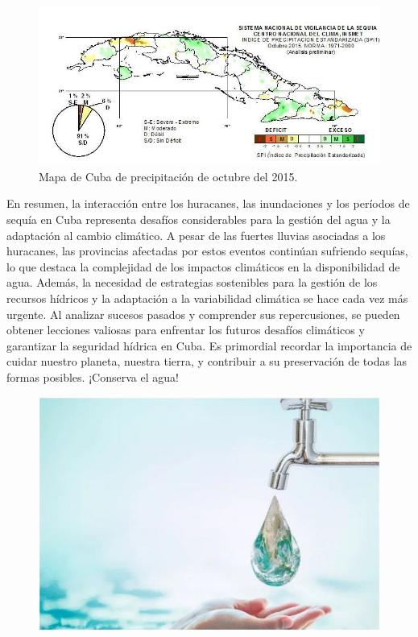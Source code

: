 \documentclass[12pt]{article}
\begin{document}
	\begin{figure}[H]
		\centering
		\includegraphics[width=0.7\linewidth]{./Report/images/mapa_octubre_2015}
		\caption{Mapa de Cuba de precipitación de octubre del 2015.}
		\label{fig:mapaoctubre2015}
	\end{figure}
	
	En resumen, la interacción entre los huracanes, las inundaciones y los períodos de sequía en Cuba representa desafíos considerables para la gestión del agua y la adaptación al cambio climático. A pesar de las fuertes lluvias asociadas a los huracanes, las provincias afectadas por estos eventos continúan sufriendo sequías, lo que destaca la complejidad de los impactos climáticos en la disponibilidad de agua. Además, la necesidad de estrategias sostenibles para la gestión de los recursos hídricos y la adaptación a la variabilidad climática se hace cada vez más urgente. Al analizar sucesos pasados y comprender sus repercusiones, se pueden obtener lecciones valiosas para enfrentar los futuros desafíos climáticos y garantizar la seguridad hídrica en Cuba. Es primordial recordar la importancia de cuidar nuestro planeta, nuestra tierra, y contribuir a su preservación de todas las formas posibles. ¡Conserva el agua!
	
	
	\begin{figure}[H]
		\centering
		\includegraphics[width=0.4\linewidth]{./Report/images/agua}
		\label{fig:agua}
	\end{figure}
	
\end{document}
